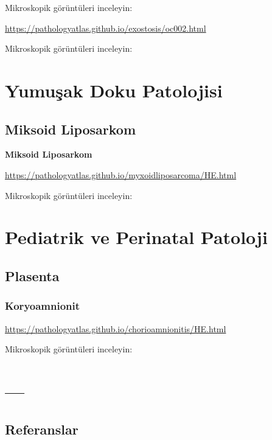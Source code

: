 \documentclass[
  letterpaper,
  DIV=11,
  numbers=noendperiod]{scrreprt}
\begin{document}
Mikroskopik görüntüleri inceleyin:

\url{https://pathologyatlas.github.io/exostosis/oc002.html}

Mikroskopik görüntüleri inceleyin:

\hypertarget{section-1}{%
\subsection{}\label{section-1}}

\part{Yumuşak Doku Patolojisi}

\hypertarget{miksoid-liposarkom}{%
\chapter{Miksoid Liposarkom}\label{miksoid-liposarkom}}

\textbf{Miksoid Liposarkom}

\url{https://pathologyatlas.github.io/myxoidliposarcoma/HE.html}

Mikroskopik görüntüleri inceleyin:

\part{Pediatrik ve Perinatal Patoloji}

\hypertarget{plasenta}{%
\chapter{Plasenta}\label{plasenta}}

\hypertarget{koryoamnionit}{%
\section{Koryoamnionit}\label{koryoamnionit}}

\url{https://pathologyatlas.github.io/chorioamnionitis/HE.html}

Mikroskopik görüntüleri inceleyin:

\part{---}


\hypertarget{referanslar}{%
\chapter*{Referanslar}\label{referanslar}}
\end{document}
